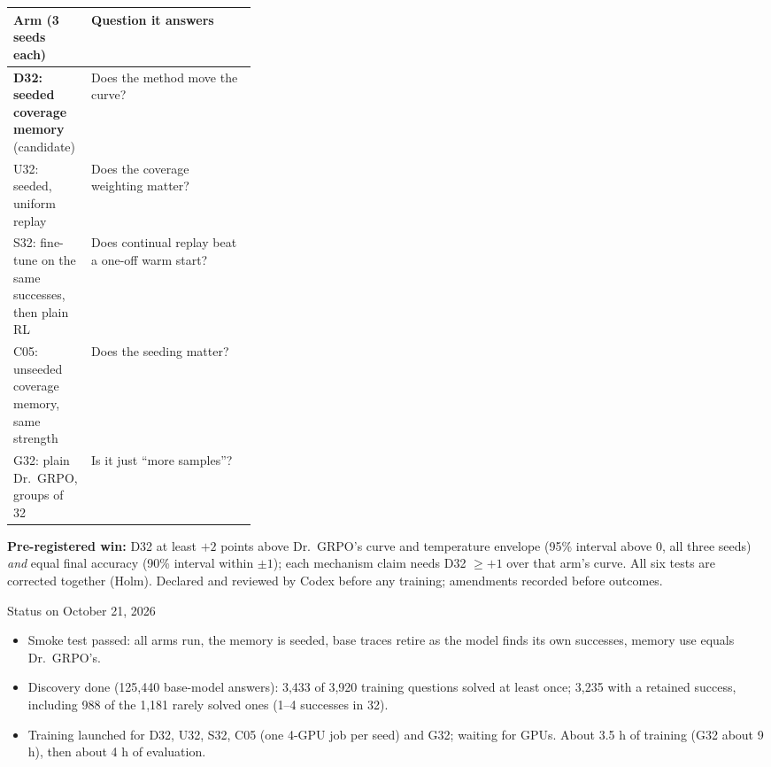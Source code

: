 \documentclass[11pt]{article}
\begin{document}
\begin{center}\small
\begin{tabularx}{\linewidth}{@{}p{0.32\linewidth}Y@{}}
\toprule
Arm (3 seeds each) & Question it answers\\
\midrule
\textbf{D32: seeded coverage memory} (candidate) & Does the method move the curve?\\
U32: seeded, uniform replay & Does the coverage weighting matter?\\
S32: fine-tune on the same successes, then plain RL & Does continual replay beat a one-off warm start?\\
C05: unseeded coverage memory, same strength & Does the seeding matter?\\
G32: plain Dr.\ GRPO, groups of 32 & Is it just ``more samples''?\\
\bottomrule
\end{tabularx}
\end{center}

\textbf{Pre-registered win:} D32 at least $+2$ points above Dr.\ GRPO's curve and temperature envelope (95\% interval above 0, all three seeds) \emph{and} equal final accuracy (90\% interval within $\pm1$); each mechanism claim needs D32 $\ge+1$ over that arm's curve. All six tests are corrected together (Holm). Declared and reviewed by Codex before any training; amendments recorded before outcomes.

\begin{now}{{Status on October 21, 2026}}
\begin{itemize}
\item Smoke test passed: all arms run, the memory is seeded, base traces retire as the model finds its own successes, memory use equals Dr.\ GRPO's.
\item Discovery done (125,440 base-model answers): 3,433 of 3,920 training questions solved at least once; 3,235 with a retained success, including 988 of the 1,181 rarely solved ones (1--4 successes in 32).
\item Training launched for D32, U32, S32, C05 (one 4-GPU job per seed) and G32; waiting for GPUs. About 3.5 h of training (G32 about 9 h), then about 4 h of evaluation.
\end{itemize}
\end{now}
\end{document}
